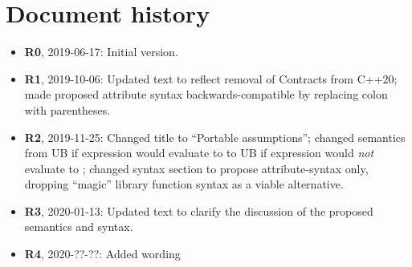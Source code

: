 \section*{Document history}

\begin{itemize}
\item \textbf{R0}, 2019-06-17: Initial version.
\item \textbf{R1}, 2019-10-06: Updated text to reflect removal of Contracts from C++20; made proposed attribute syntax backwards-compatible by replacing colon with parentheses.
\item \textbf{R2}, 2019-11-25: Changed title to ``Portable assumptions''; changed semantics from UB if expression would evaluate to  to UB if expression would \emph{not} evaluate to ; changed syntax section to propose attribute-syntax only, dropping ``magic'' library function syntax as a viable alternative.
\item \textbf {R3}, 2020-01-13: Updated text to clarify the discussion of the proposed semantics and syntax.
\item \textbf{R4}, 2020-??-??:  Added wording
\end{itemize}

\renewcommand{\bibname}{References}



